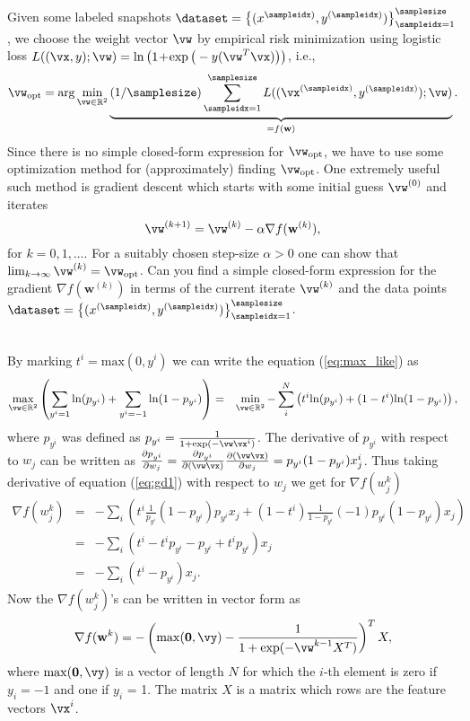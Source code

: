 \documentclass[article,11pt]{article}
\begin{document}
Given some labeled snapshots $\dataset = \left\lbrace (x^{\sampleidx)}, y^{(\sampleidx)}) \right\rbrace_{\sampleidx=1}^{\samplesize}$, we choose the weight vector $\vw$ 
by empirical risk minimization using logistic loss $L((\vx,y); \vw) = \ln\big(1\!+\!\exp\big(- y (\vw^{T} \vx)\big)\big)$, i.e., 
\begin{equation}
\vw_{\rm opt} = \arg \min\limits_{\vw \in \mathbb{R}^{2}} \underbrace{(1/\samplesize) \sum_{\sampleidx=1}^{\samplesize} L((\vx^{(\sampleidx)},y^{(\sampleidx)}); \vw)}_{=f(\mathbf{w})}.
\end{equation} 
Since there is no simple closed-form expression for $\vw_{\rm opt}$, we have to use some optimization method for (approximately) finding $\vw_{\rm opt}$. One extremely useful such 
method is gradient descent which starts with some initial guess $\vw^{(0)}$ and iterates 
\begin{equation}
\vw^{(k+1)} = \vw^{(k)} - \alpha \nabla f(\mathbf{w}^{(k)}), 
\end{equation}
for $k=0,1,\ldots$. For a suitably chosen step-size $\alpha >0$ one can show that $\lim_{k \rightarrow \infty} \vw^{(k)} = \vw_{\rm opt}$. Can you find a simple closed-form expression 
for the gradient $\nabla f(\mathbf{w}^{(k)})$ in terms of the current iterate $\vw^{(k)}$ and the data points $\dataset = \left\lbrace (x^{(\sampleidx)}, y^{(\sampleidx)}) \right\rbrace_{\sampleidx=1}^{\samplesize}$.  

 
\\
By marking $t^i=\mathrm{max}(0,y^i)$ we can write the equation (\ref{eq:max_like}) as
\begin{eqnarray}
  \max\limits_{\vw \in \mathbb{R}^{2}}\left(\sum_{y^i=1}\mathrm{ln}(p_{y^i}) + \sum_{y^i=-1}\mathrm{ln}(1-p_{y^i})\right)&=&\min\limits_{\vw \in \mathbb{R}^{2}}-\sum_i^N\left(t^i\mathrm{ln}(p_{y^i})+(1-t^i)\mathrm{ln}(1-p_{y^i})\right),
  \label{eq:gd1}
\end{eqnarray}
where $p_{y^i}$ was defined as $p_{y^i}=\frac{1}{1+\mathrm{exp}(-\vw\vx^i)}$. The derivative of $p_{y^i}$ with respect to $w_j$ can be written as $\frac{\partial p_{y^i}}{\partial w_j}=\frac{\partial p_{y^i}}{\partial (\vw\vx)}\frac{\partial (\vw\vx)}{\partial w_j} = p_{y^i}(1-p_{y^i})x_j^i$. Thus taking derivative of equation (\ref{eq:gd1}) with
respect to $w_j$ we get for $\nabla f(w_j^k)$
\begin{eqnarray}
  \nabla f(w_j^k) &=&-\sum_i\left(t^i\frac{1}{p_{y^i}}(1-p_{y^i})p_{y^i}x_j+(1-t^i)\frac{1}{1-p_{y^i}}(-1)p_{y^i}(1-p_{y^i})x_j\right)\nonumber\\
  &=&-\sum_i\left(t^i -t^ip_{y^i}-p_{y^i}+t^ip_{y^i}\right)x_j\nonumber\\
  &=&-\sum_i(t^i-p_{y^i})x_j.
\end{eqnarray}
Now the $\nabla f(w_j^k)$'s can be written in vector form as
\begin{equation}
  \nabla f(\mathbf{w}^k) = -\left(\mathrm{max}(\mathbf{0},\vy)-\frac{1}{1+\mathrm{exp}(-\vw^{k-1} X^T)}\right)^TX,
\end{equation}
where $\mathrm{max}(\mathbf{0},\vy)$ is a vector of length $N$ for which the
$i$-th element is zero if $y_i=-1$ and one if $y_i$ = 1. The matrix $X$ is a
matrix which rows are the feature vectors $\vx^i$.
\end{document}
